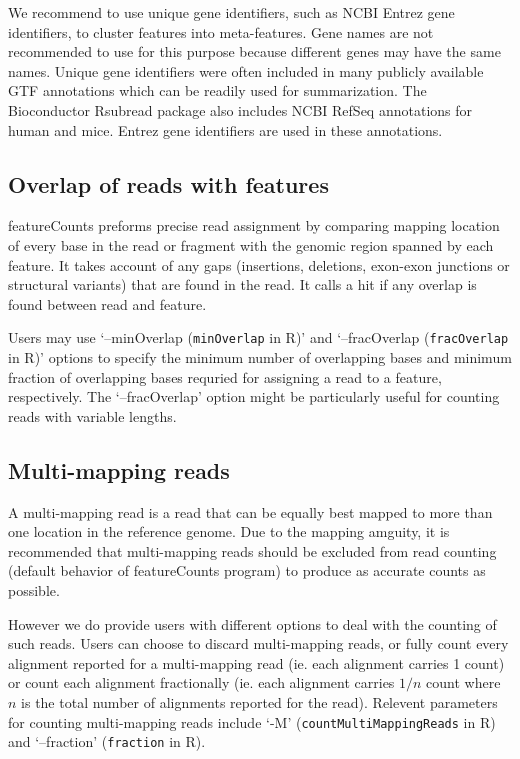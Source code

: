 \documentclass[12pt]{report}
\newcommand{\code}[1]{{\small\texttt{#1}}}
\newcommand{\Rsubread}{\textsf{Rsubread}}
\newcommand{\featureCounts}{\textsf{featureCounts}}
\newcommand{\R}{\textsf{R}}
\begin{document}
We recommend to use unique gene identifiers, such as NCBI Entrez gene identifiers, to cluster features into meta-features. Gene names are not recommended to use for this purpose because different genes may have the same names. Unique gene identifiers were often included in many publicly available GTF annotations which can be readily used for summarization. The Bioconductor {\Rsubread} package also includes NCBI RefSeq annotations for human and mice. Entrez gene identifiers are used in these annotations.

\subsection{Overlap of reads with features}

{\featureCounts} preforms precise read assignment by comparing mapping location of every base in the read or fragment with the genomic region spanned by each feature.
It takes account of any gaps (insertions, deletions, exon-exon junctions or structural variants) that are found in the read.
It calls a hit if any overlap is found between read and feature.

Users may use `--minOverlap (\code{minOverlap} in \R)' and `--fracOverlap (\code{fracOverlap} in \R)' options to specify the minimum number of overlapping bases and minimum fraction of overlapping bases requried for assigning a read to a feature, respectively.
The `--fracOverlap' option might be particularly useful for counting reads with variable lengths.

\subsection{Multi-mapping reads}

A multi-mapping read is a read that can be equally best mapped to more than one location in the reference genome.
Due to the mapping amguity, it is recommended that multi-mapping reads should be excluded from read counting (default behavior of {\featureCounts} program) to produce as accurate counts as possible.

However we do provide users with different options to deal with the counting of such reads.
Users can choose to discard multi-mapping reads, or fully count every alignment reported for a multi-mapping read (ie. each alignment carries 1 count) or count each alignment fractionally  (ie. each alignment carries $1/n$ count where $n$ is the total number of alignments reported for the read).
Relevent parameters for counting multi-mapping reads include `-M' (\code{countMultiMappingReads} in \R) and `--fraction' (\code{fraction} in \R).
\end{document}
